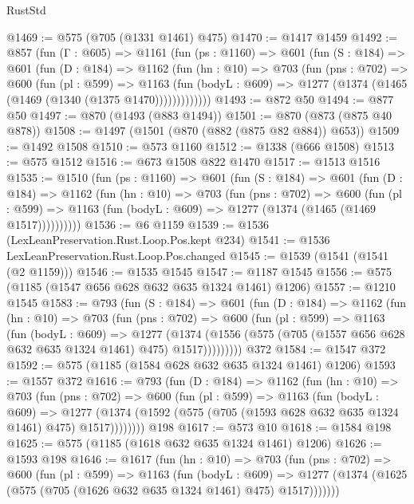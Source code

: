 \begin{lexlean}{RustStd}
\begin{coremodule}
@1469 := @575 (@705 (@1331 @1461) @475)
@1470 := @1417 @1459
@1492 := @857
    (fun (Γ : @605) =>
    @1161
      (fun (ps : @1160) =>
      @601
        (fun (S : @184) =>
        @601
          (fun (D : @184) =>
          @1162
            (fun (hn : @10) =>
            @703
              (fun (pns : @702) =>
              @600
                (fun (pl : @599) =>
                @1163
                  (fun (bodyL : @609) => @1277 (@1374 (@1465 (@1469 (@1340 (@1375 @1470)))))))))))))
@1493 := @872 @50
@1494 := @877 @50
@1497 := @870 (@1493 (@883 @1494))
@1501 := @870 (@873 (@875 @40 @878))
@1508 := @1497 (@1501 (@870 (@882 (@875 @82 @884)) @653))
@1509 := @1492 @1508
@1510 := @573 @1160
@1512 := @1338 (@666 @1508)
@1513 := @575 @1512
@1516 := @673 @1508 @822 @1470
@1517 := @1513 @1516
@1535 := @1510
    (fun (ps : @1160) =>
    @601
      (fun (S : @184) =>
      @601
        (fun (D : @184) =>
        @1162
          (fun (hn : @10) =>
          @703
            (fun (pns : @702) =>
            @600
              (fun (pl : @599) =>
              @1163 (fun (bodyL : @609) => @1277 (@1374 (@1465 (@1469 @1517))))))))))
@1536 := @6 @1159
@1539 := @1536 (LexLeanPreservation.Rust.Loop.Pos.kept @234)
@1541 := @1536 LexLeanPreservation.Rust.Loop.Pos.changed
@1545 := @1539 (@1541 (@1541 (@2 @1159)))
@1546 := @1535 @1545
@1547 := @1187 @1545
@1556 := @575 (@1185 (@1547 @656 @628 @632 @635 @1324 @1461) @1206)
@1557 := @1210 @1545
@1583 := @793
    (fun (S : @184) =>
    @601
      (fun (D : @184) =>
      @1162
        (fun (hn : @10) =>
        @703
          (fun (pns : @702) =>
          @600
            (fun (pl : @599) =>
            @1163
              (fun (bodyL : @609) =>
              @1277
                (@1374
                  (@1556 (@575 (@705 (@1557 @656 @628 @632 @635 @1324 @1461) @475) @1517)))))))))
    @372
@1584 := @1547 @372
@1592 := @575 (@1185 (@1584 @628 @632 @635 @1324 @1461) @1206)
@1593 := @1557 @372
@1616 := @793
    (fun (D : @184) =>
    @1162
      (fun (hn : @10) =>
      @703
        (fun (pns : @702) =>
        @600
          (fun (pl : @599) =>
          @1163
            (fun (bodyL : @609) =>
            @1277 (@1374 (@1592 (@575 (@705 (@1593 @628 @632 @635 @1324 @1461) @475) @1517))))))))
    @198
@1617 := @573 @10
@1618 := @1584 @198
@1625 := @575 (@1185 (@1618 @632 @635 @1324 @1461) @1206)
@1626 := @1593 @198
@1646 := @1617
    (fun (hn : @10) =>
    @703
      (fun (pns : @702) =>
      @600
        (fun (pl : @599) =>
        @1163
          (fun (bodyL : @609) =>
          @1277 (@1374 (@1625 (@575 (@705 (@1626 @632 @635 @1324 @1461) @475) @1517)))))))

\end{coremodule}
\end{lexlean}
